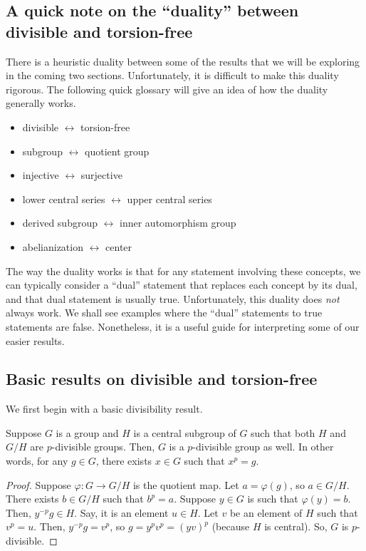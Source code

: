 \documentclass{ucetd}
\begin{document}
\subsection*{A quick note on the ``duality'' between divisible and torsion-free}

There is a heuristic duality between some of the results that we will
be exploring in the coming two sections. Unfortunately, it is
difficult to make this duality rigorous. The following quick glossary
will give an idea of how the duality generally works.

\begin{itemize}
\item divisible $\leftrightarrow$ torsion-free
\item subgroup $\leftrightarrow$ quotient group
\item injective $\leftrightarrow$ surjective
\item lower central series $\leftrightarrow$ upper central series
\item derived subgroup $\leftrightarrow$ inner automorphism group
\item abelianization $\leftrightarrow$ center
\end{itemize}

The way the duality works is that for any statement involving these
concepts, we can typically consider a ``dual'' statement that replaces
each concept by its dual, and that dual statement is usually
true. Unfortunately, this duality does {\em not} always work. We shall
see examples where the ``dual'' statements to true statements are
false. Nonetheless, it is a useful guide for interpreting some of our
easier results.


\subsection{Basic results on divisible and torsion-free}

We first begin with a basic divisibility result.

\begin{lemma}\label{divisibility-extension-group}
  Suppose $G$ is a group and $H$ is a central subgroup of $G$ such
  that both $H$ and $G/H$ are $p$-divisible groups. Then, $G$ is a
  $p$-divisible group as well. In other words, for any $g \in G$,
  there exists $x \in G$ such that $x^p = g$.
\end{lemma}

\begin{proof}
  Suppose $\varphi:G \to G/H$ is the quotient map. Let $a =
  \varphi(g)$, so $a \in G/H$. There exists $b \in G/H$ such that $b^p
  = a$. Suppose $y \in G$ is such that $\varphi(y) = b$. Then,
  $y^{-p}g \in H$. Say, it is an element $u \in H$. Let $v$ be an
  element of $H$ such that $v^p = u$. Then, $y^{-p}g = v^p$, so $g =
  y^pv^p = (yv)^p$ (because $H$ is central). So, $G$ is $p$-divisible.
\end{proof}
\end{document}
